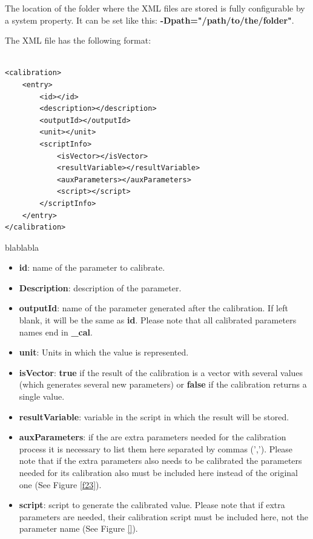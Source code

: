 The location of the folder where the XML files are stored is fully configurable by a system property. It can be set like this: \textbf{-Dpath="/path/to/the/folder"}.

The XML file has the following format:
\begin{table}[h]
\lstset{language=XML}
\begin{lstlisting}

<calibration>
	<entry>
		<id></id>
		<description></description>
		<outputId></outputId>
		<unit></unit>
		<scriptInfo>
			<isVector></isVector>
			<resultVariable></resultVariable>
			<auxParameters></auxParameters>
			<script></script>
		</scriptInfo>
	</entry>
</calibration>
\end{lstlisting}
\caption{blablabla}
\label{Table5.890}
\end{table}

\begin{itemize}
\item \textbf{id}: name of the parameter to calibrate.
\item \textbf{Description}: description of the parameter.
\item \textbf{outputId}: name of the parameter generated after the calibration. If left blank, it will be the same as \textbf{id}. Please note that all calibrated parameters names end in \textbf{\_cal}.
\item \textbf{unit}: Units in which the value is represented.
\item \textbf{isVector}: \textbf{true} if the result of the calibration is a vector with several values (which generates several new parameters) or \textbf{false} if the calibration returns a single value.
\item \textbf{resultVariable}: variable in the script in which the result will be stored.
\item \textbf{auxParameters}: if the are extra parameters needed for the calibration process it is necessary to list them here separated by commas (','). Please note that if the extra parameters also needs to be calibrated the parameters needed for its calibration also must be included here instead of the original one (See Figure \ref{f23}).
\item \textbf{script}: script to generate the calibrated value. Please note that if extra parameters are needed, their calibration script must be included here, not the parameter name (See Figure \ref{}). 
\end{itemize}



